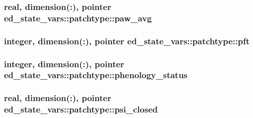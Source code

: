 \subsubsection[{\texorpdfstring{paw\+\_\+avg}{paw_avg}}]{\setlength{\rightskip}{0pt plus 5cm}real, dimension(\+:), pointer ed\+\_\+state\+\_\+vars\+::patchtype\+::paw\+\_\+avg}\hypertarget{structed__state__vars_1_1patchtype_a326b6a6ba6287a0b8344e50af8f9dc88}{}\label{structed__state__vars_1_1patchtype_a326b6a6ba6287a0b8344e50af8f9dc88}
\subsubsection[{\texorpdfstring{pft}{pft}}]{\setlength{\rightskip}{0pt plus 5cm}integer, dimension(\+:), pointer ed\+\_\+state\+\_\+vars\+::patchtype\+::pft}\hypertarget{structed__state__vars_1_1patchtype_a0ff01a242b0e1e295f040e39925a9391}{}\label{structed__state__vars_1_1patchtype_a0ff01a242b0e1e295f040e39925a9391}
\subsubsection[{\texorpdfstring{phenology\+\_\+status}{phenology_status}}]{\setlength{\rightskip}{0pt plus 5cm}integer, dimension(\+:), pointer ed\+\_\+state\+\_\+vars\+::patchtype\+::phenology\+\_\+status}\hypertarget{structed__state__vars_1_1patchtype_ad26d9c0beab468e975daa53ec443cce1}{}\label{structed__state__vars_1_1patchtype_ad26d9c0beab468e975daa53ec443cce1}
\subsubsection[{\texorpdfstring{psi\+\_\+closed}{psi_closed}}]{\setlength{\rightskip}{0pt plus 5cm}real, dimension(\+:), pointer ed\+\_\+state\+\_\+vars\+::patchtype\+::psi\+\_\+closed}\hypertarget{structed__state__vars_1_1patchtype_a37e1a5a8e68d7fe3b54af4ee5ac0c5b6}{}\label{structed__state__vars_1_1patchtype_a37e1a5a8e68d7fe3b54af4ee5ac0c5b6}

